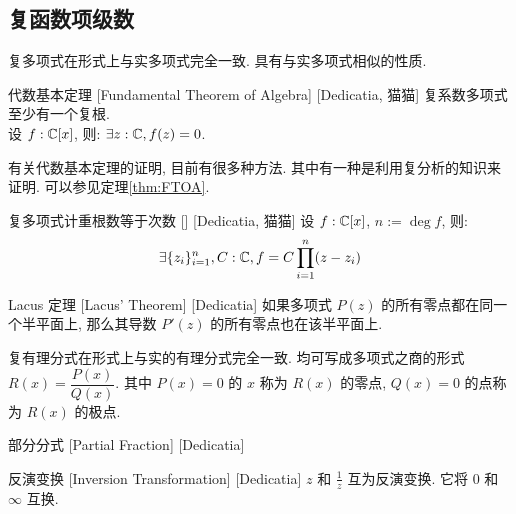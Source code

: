     \subsection{复函数项级数}

        复多项式在形式上与实多项式完全一致. 具有与实多项式相似的性质. 

        \begin{thm}
            {代数基本定理}
            [Fundamental Theorem of Algebra]
            [Dedicatia, 猫猫]
            复系数多项式至少有一个复根. \\
            设 \(f:\operatorname{\mathbb{C}}[x]\), 则: \(\exists z:\operatorname{\mathbb{C}}, f(z)=0\). 
        \end{thm}

        \begin{rmk}
            [Dedicatia]
            有关代数基本定理的证明, 目前有很多种方法. 其中有一种是利用复分析的知识来证明. 可以参见定理\ref{thm:FTOA}.
        \end{rmk}
        
        \begin{crl}
            {复多项式计重根数等于次数}
            []
            [Dedicatia, 猫猫]
            设 \(f:\operatorname{\mathbb{C}}[x]\), \(n:=\deg f\), 则: 
            \[\exists \{z_i\}_{i=1}^n, C:\operatorname{\mathbb{C}}, f=C\prod_{i=1}^n(z-z_i)\]
        \end{crl}

        \begin{thm}
            [Lacus]
            {Lacus 定理}
            [Lacus' Theorem]
            [Dedicatia]
            如果多项式 \(P(z)\) 的所有零点都在同一个半平面上, 那么其导数 \(P'(z)\) 的所有零点也在该半平面上. 
        \end{thm}

        复有理分式在形式上与实的有理分式完全一致. 均可写成多项式之商的形式 \(R(x)=\dfrac{P(x)}{Q(x)}\). 其中 \(P(x)=0\) 的 \(x\) 称为 \(R(x)\) 的零点,  \(Q(x)=0\) 的点称为 \(R(x)\) 的极点. 

        \begin{dfn}
            {部分分式}
            [Partial Fraction]
            [Dedicatia]
            \bysorry
        \end{dfn}

        \begin{dfn}
            {反演变换}
            [Inversion Transformation]
            [Dedicatia]
            \(z\) 和 \(\frac{1}{z}\) 互为反演变换. 它将 \(0\) 和 \(\infty\) 互换. 
        \end{dfn}

